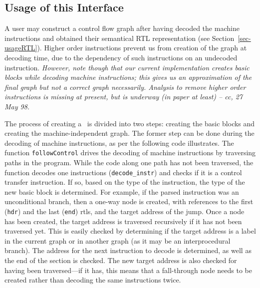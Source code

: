 \subsection{Usage of this Interface}
\label{sec-cfg-eg}
A user may construct a control flow graph after having decoded  
the machine instructions and obtained their semantical 
RTL representation (see Section~\ref{sec-usageRTL}).  
Higher order instructions prevent us from creation of the graph 
at decoding time, due to the dependency of such instructions 
on an undecoded instruction.
\emph{However, note though that our current implementation 
creates basic blocks while decoding machine instructions; 
this gives us an approximation of the final graph but not 
a correct graph necessarily.  Analysis to remove higher order instructions
is missing at present, but is underway (in paper at least) -- cc,
27 May 98.}

The process of creating a \wfCFG\ is divided into two steps:
creating the basic blocks and creating the machine-independent
graph.  The former step can be done during the decoding of
machine instructions, as per the following code illustrates.
The function \texttt{followControl} drives the decoding of 
machine instructions by traversing paths in the program. 
While the code along one path has not been traversed, the 
function decodes one instructions (\texttt{decode\_instr}) and
checks if it is a control transfer instruction.  If so, based
on the type of the instruction, the type of the new basic
block is determined.  For example, if the parsed instruction
was an unconditional branch, then a one-way node is created,
with references to the first (\texttt{hdr}) and the last (\texttt{end})
rtls, and the target address of the jump. 
Once a node has been created, the target address is traversed 
recursively if it has not been traversed yet.  This is easily checked by 
determining if the target address is a label in the current 
graph or in another graph (as it may be an interprocedural branch).
The address for the next instruction to decode is determined, 
as well as the end of the section is checked.  The new target 
address is also checked for having been traversed---if it has, this
means that a fall-through node needs to be created rather than
decoding the same instructions twice.

